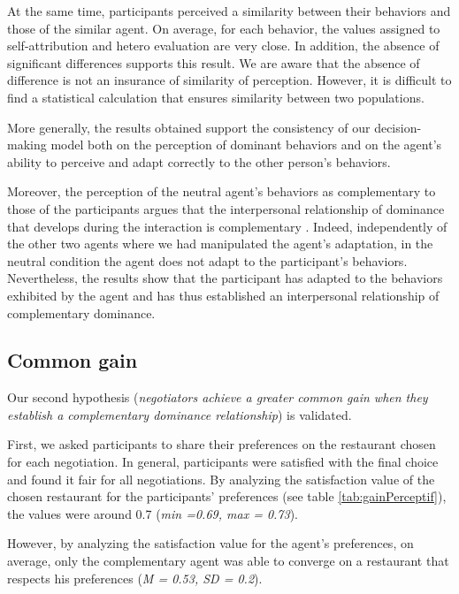 \documentclass{llncs}
\begin{document}
At the same time, participants perceived a similarity between their behaviors and those of the similar agent. On average, for each behavior, the values assigned to self-attribution and hetero evaluation are very close. In addition, the absence of significant differences supports this result. We are aware that the absence of difference is not an insurance of similarity of perception. However, it is difficult to find a statistical calculation that ensures similarity between two populations.

More generally, the results obtained support the consistency of our decision-making model both on the perception of dominant behaviors and on the agent's ability to perceive and adapt correctly to the other person's behaviors.  

Moreover, the perception of the neutral agent's behaviors as complementary to those of the participants argues that the interpersonal relationship of dominance that develops during the interaction is complementary \cite{burgoonnonverbal}. Indeed, independently of the other two agents where we had manipulated the agent's adaptation, in the neutral condition the agent does not adapt to the participant's behaviors. Nevertheless, the results show that the participant has adapted to the behaviors exhibited by the agent and has thus established an interpersonal relationship of complementary dominance.

\subsection{Common gain}
Our second hypothesis (\textit{negotiators achieve a greater common gain when they establish a complementary dominance relationship}) is validated. 

First, we asked participants to share their preferences on the restaurant chosen for each negotiation.
In general, participants were satisfied with the final choice and found it fair for all negotiations. 
By analyzing the satisfaction value of the chosen restaurant for the participants' preferences (see table \ref{tab:gainPerceptif}), the values were around 0.7 (\emph{min =0.69, max = 0.73}). 

However, by analyzing the satisfaction value for the agent's preferences, on average, only the complementary agent was able to converge on a restaurant that respects his preferences (\emph{M = 0.53, SD = 0.2}). 
\end{document}
